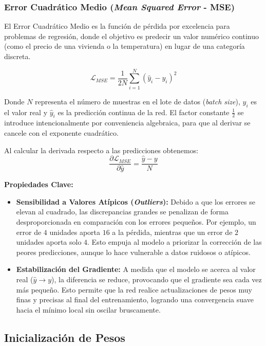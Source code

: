 \subsubsection{Error Cuadrático Medio (\textit{Mean Squared Error} - MSE)}

El Error Cuadrático Medio es la función de pérdida por excelencia para problemas de regresión, donde el objetivo es predecir un valor numérico continuo (como el precio de una vivienda o la temperatura) en lugar de una categoría discreta.

\begin{equation}
    \mathcal{L}_{MSE} = \frac{1}{2N}\sum_{i=1}^N \left(\hat{y}_i - y_i\right)^2
\end{equation}

Donde $N$ representa el número de muestras en el lote de datos (\textit{batch size}), $y_i$ es el valor real y $\hat{y}_i$ es la predicción continua de la red. El factor constante $\frac{1}{2}$ se introduce intencionalmente por conveniencia algebraica, para que al derivar se cancele con el exponente cuadrático.

Al calcular la derivada respecto a las predicciones obtenemos:
\begin{equation}
    \frac{\partial \mathcal{L}_{MSE}}{\partial \hat{y}} = \frac{\hat{y} - y}{N}
\end{equation}

\textbf{Propiedades Clave:}
\begin{itemize}
    \item \textbf{Sensibilidad a Valores Atípicos (\textit{Outliers}):} Debido a que los errores se elevan al cuadrado, las discrepancias grandes se penalizan de forma desproporcionada en comparación con los errores pequeños. Por ejemplo, un error de $4$ unidades aporta $16$ a la pérdida, mientras que un error de $2$ unidades aporta solo $4$. Esto empuja al modelo a priorizar la corrección de las peores predicciones, aunque lo hace vulnerable a datos ruidosos o atípicos.
    \item \textbf{Estabilización del Gradiente:} A medida que el modelo se acerca al valor real ($\hat{y} \to y$), la diferencia se reduce, provocando que el gradiente sea cada vez más pequeño. Esto permite que la red realice actualizaciones de pesos muy finas y precisas al final del entrenamiento, logrando una convergencia suave hacia el mínimo local sin oscilar bruscamente.
\end{itemize}

\subsection{Inicialización de Pesos}

